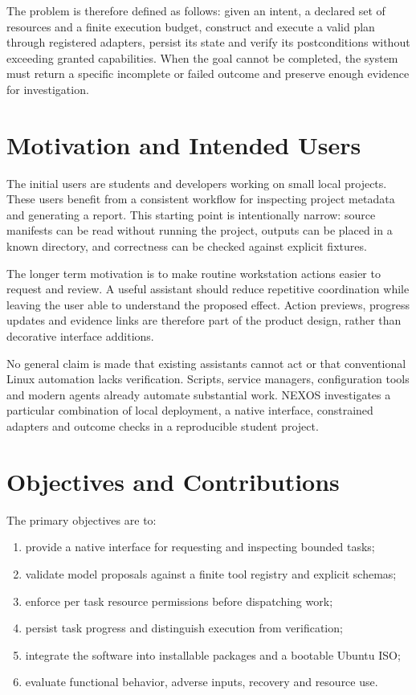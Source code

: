 The problem is therefore defined as follows: given an intent, a declared set of resources and a finite execution budget, construct and execute a valid plan through registered adapters, persist its state and verify its postconditions without exceeding granted capabilities. When the goal cannot be completed, the system must return a specific incomplete or failed outcome and preserve enough evidence for investigation.

\section{Motivation and Intended Users}
The initial users are students and developers working on small local projects. These users benefit from a consistent workflow for inspecting project metadata and generating a report. This starting point is intentionally narrow: source manifests can be read without running the project, outputs can be placed in a known directory, and correctness can be checked against explicit fixtures.

The longer term motivation is to make routine workstation actions easier to request and review. A useful assistant should reduce repetitive coordination while leaving the user able to understand the proposed effect. Action previews, progress updates and evidence links are therefore part of the product design, rather than decorative interface additions.

No general claim is made that existing assistants cannot act or that conventional Linux automation lacks verification. Scripts, service managers, configuration tools and modern agents already automate substantial work. NEXOS investigates a particular combination of local deployment, a native interface, constrained adapters and outcome checks in a reproducible student project.

\section{Objectives and Contributions}
The primary objectives are to:
\begin{enumerate}
\item provide a native interface for requesting and inspecting bounded tasks;
\item validate model proposals against a finite tool registry and explicit schemas;
\item enforce per task resource permissions before dispatching work;
\item persist task progress and distinguish execution from verification;
\item integrate the software into installable packages and a bootable Ubuntu ISO;
\item evaluate functional behavior, adverse inputs, recovery and resource use.
\end{enumerate}

